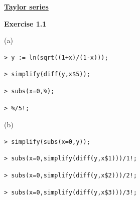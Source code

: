 \documentclass{article}
\begin{document}
\lstset{basicstyle=\ttfamily,breaklines=true,columns=flexible}
\pagestyle{empty}
\begin{center}
\begin{Maple Normal}
\underline{\textbf{Taylor series}}
\end{Maple Normal}
\end{center}
\begin{Maple Heading 2}
\textbf{Exercise 1.1}
\end{Maple Heading 2}
\begin{Maple Normal}
(a)
\end{Maple Normal}
\begin{lstlisting}
> y := ln(sqrt((1+x)/(1-x)));
\end{lstlisting}
\begin{lstlisting}
> simplify(diff(y,x$5));
\end{lstlisting}
\begin{lstlisting}
> subs(x=0,%);
\end{lstlisting}
\begin{lstlisting}
> %/5!;
\end{lstlisting}
\begin{Maple Normal}
(b)
\end{Maple Normal}
\begin{lstlisting}
> simplify(subs(x=0,y));
\end{lstlisting}
\begin{lstlisting}
> subs(x=0,simplify(diff(y,x$1)))/1!;
\end{lstlisting}
\begin{lstlisting}
> subs(x=0,simplify(diff(y,x$2)))/2!;
\end{lstlisting}
\begin{lstlisting}
> subs(x=0,simplify(diff(y,x$3)))/3!;
\end{lstlisting}
\end{document}
